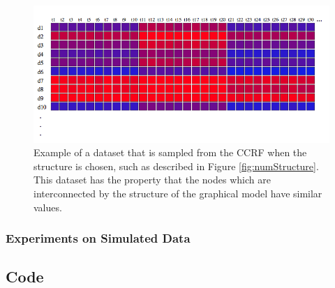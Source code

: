 \documentclass{sfuthesis}
\begin{document}
\begin{figure}
\begin{center}
\includegraphics[scale=0.5]{numeric_sample.png}
\end{center}
\caption{Example of a dataset that is sampled from the CCRF when the structure is chosen, such as described in Figure \ref{fig:numStructure}. This dataset has the property that the nodes which are interconnected by the structure of the graphical model have similar values.}
\label{fig:numSample}
\end{figure}

\subsection{Experiments on Simulated Data}





%
%
%
%
%

\backmatter%
	
	

\begin{appendices} %
	\chapter{Code}
\end{appendices}
\end{document}
